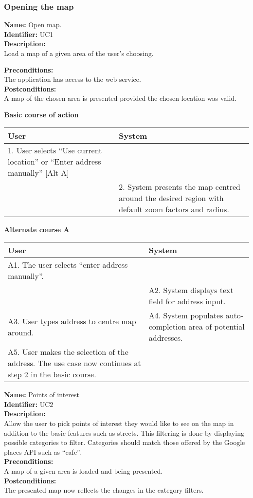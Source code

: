 \documentclass[11pt,twoside,a4paper]{article}
\begin{document}
\subsubsection{Opening the map}
\textbf{Name:} Open map.\\
\textbf{Identifier:} UC1\\
\textbf{Description:}\\
Load a map of a given area of the user's choosing.

\textbf{Preconditions:}\\
The application has access to the web service.\\
\textbf{Postconditions:}\\
A map of the chosen area is presented provided the chosen location was
valid.

\textbf{Basic course of action}\\
\begin{tabularx}{\textwidth}{ |X|X|}
  \hline
  \textbf{User} & \textbf{System}\\
  \hline
  1. User selects ``Use current location'' or ``Enter address manually''
  [Alt A] & \\
  \hline
  & 2. System presents the map centred around the desired region with
  default zoom factors and radius.\\
  \hline
\end{tabularx}

\textbf{Alternate course A}\\
\begin{tabularx}{\textwidth}{ |X|X| }
  \hline
  \textbf{User} & \textbf{System}\\
  \hline
  A1. The user selects ``enter address manually''. & \\
  \hline
  & A2. System displays text field for address input.\\
  \hline
  A3. User types address to centre map around. & A4. System populates
  auto-completion area of potential addresses.\\
  \hline
  A5. User makes the selection of the address. The use case now
  continues at step 2 in the basic course. & \\
  \hline
\end{tabularx}

\textbf{Name:} Points of interest\\
\textbf{Identifier:} UC2\\
\textbf{Description:}\\
Allow the user to pick points of interest they would like to see on the
map in addition to the basic features such as streets. This filtering is
done by displaying possible categories to filter. Categories should
match those offered by the Google places API such as ``cafe''.\\
\textbf{Preconditions:}\\
A map of a given area is loaded and being presented.\\
\textbf{Postconditions:}\\
The presented map now reflects the changes in the category filters.
\end{document}
